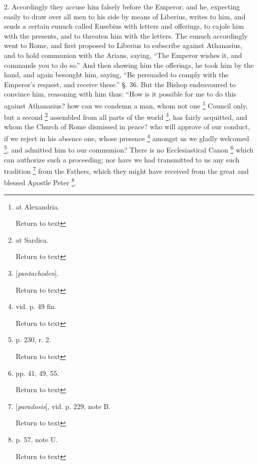2. Accordingly they accuse him falsely before the
Emperor; and he, expecting easily to draw over all men to his side by
means of Liberius, writes to him, and sends a certain eunuch called
Eusebius with letters and offerings, to cajole him with the presents,
and to threaten him with the letters. The eunuch accordingly went to
Rome, and first proposed to Liberius to subscribe against Athanasius,
and to hold communion with the Arians, saying, ``The Emperor wishes it,
and commands you to do so.'' And then showing him the offerings, he
took him by the hand, and again besought him, saying, ``Be persuaded to
comply with the Emperor's request, and receive these.'' §. 36. But the
Bishop endeavoured to convince him, reasoning with him thus: ``How is
it possible for me to do this against Athanasius? how can we condemn a
man, whom not one \footnote{at Alexandria.

Return to text} Council only, but a
second \footnote{at Sardica.

Return to text} assembled from all parts of the
world \footnote{[\emph{pantachoden}].

Return to text}, has fairly acquitted, and whom
the Church of Rome dismissed in peace? who will approve of our
conduct, if we reject in his absence one, whose presence \footnote{vid. p. 49 fin.

Return to text} amongst us we gladly welcomed \footnote{p. 230, r. 2.

Return to text}, and
admitted him to our communion? There is no Ecclesiastical Canon \footnote{pp. 41, 49, 55.

Return to text} which can authorize such a proceeding; nor have we had transmitted
to us any such tradition \footnote{[\emph{paradosis}], vid. p. 229, note B.

Return to text} from the
Fathers, which they might have received from the great and blessed
Apostle Peter \footnote{p. 57, note U.

Return to text}.

